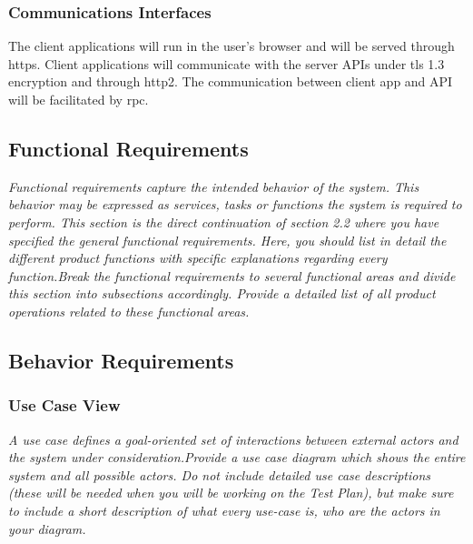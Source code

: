         \subsubsection{Communications Interfaces}\label{sec:communications-interfaces}
            The client applications will run in the user's browser and will be served through \gls{https}. Client applications will communicate with the server APIs under \gls{tls} 1.3 encryption and through \gls{http2}. The communication between client app and API will be facilitated by \gls{rpc}.
    \subsection{Functional Requirements}\label{sec:functional-requirements}
        \emph{Functional requirements capture the intended behavior of the system. This behavior may be expressed as services, tasks or functions the system is required to perform. This section is the direct continuation of section 2.2 where you have specified the general functional requirements. Here, you should list in detail the different product functions with specific explanations regarding every function.\gnl Break the functional requirements to several functional areas and divide this section into subsections accordingly. Provide a detailed list of all product operations related to these functional areas.}
    \subsection{Behavior Requirements}\label{sec:behavior-requirements}
        \subsubsection{Use Case View}\label{sec:use-case-view}
            \emph{A use case defines a goal-oriented set of interactions between external actors and the system under consideration.\gnl Provide a use case diagram which shows the entire system and all possible actors. Do not include detailed use case descriptions (these will be needed when you will be working on the Test Plan), but make sure to include a short description of what every use-case is, who are the actors in your diagram.}
